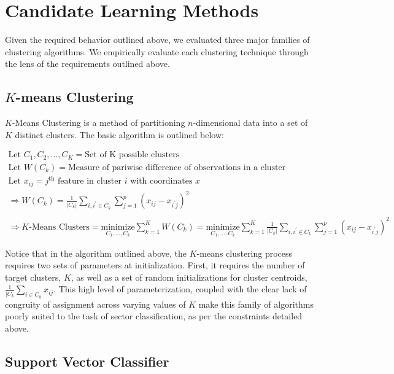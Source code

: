\documentclass[../main.tex]{subfiles}
\begin{document}
\section{Candidate Learning Methods}

Given the required behavior outlined above, we evaluated three major families of clustering algorithms. We empirically evaluate each clustering technique through the lens of the requirements outlined above.


\subsection{$K$-means Clustering}

$K$-Means Clustering is a method of partitioning $n$-dimensional data into a set of $K$ distinct clusters. The basic algorithm is outlined below:

\begin{gather*}
    \text{Let $C_1, C_2, \ldots, C_K$} = \text{Set of K possible clusters} \\
    \text{Let $W(C_k)$} = \text{Measure of pariwise difference of observations in a cluster} \\
    \text{Let $x_{ij}$} = \text{$j^\text{th}$ feature in cluster $i$ with coordinates $x$} \\
    \Rightarrow W(C_k) = \frac{1}{|C_k|} \sum_{i, i^\prime \in C_k} \sum_{j = 1}^p (x_{ij} - x_{i^\prime j})^2 \\
    \\
    \Rightarrow \text{$K$-Means Clusters}
    = \underset{C_1, \ldots, C_k}{\text{minimize}} \sum_{k=1}^K W(C_k)
    = \underset{C_1, \ldots, C_k}{\text{minimize}} \sum_{k=1}^K \frac{1}{|C_k|} \sum_{i, i^\prime \in C_k} \sum_{j = 1}^p (x_{ij} - x_{i^\prime j})^2
\end{gather*}

Notice that in the algorithm outlined above, the $K$-means clustering process requires two sets of parameters at initialization. First, it requires the number of target clusters, $K$, as well as a set of random initializations for cluster centroids, $\frac{1}{|C_k} \sum_{i \in C_k} x_{ij}$. This high level of parameterization, coupled with the clear lack of congruity of assignment across varying values of $K$ make this family of algorithms poorly suited to the task of sector classification, as per the constraints detailed above.

\subsection{Support Vector Classifier}
\end{document}

